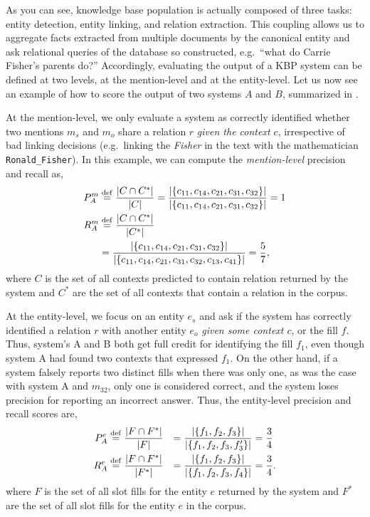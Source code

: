 As you  can see, knowledge base population is actually composed of three tasks: entity detection, entity linking, and relation extraction.
This coupling allows us to aggregate facts extracted from multiple documents by the canonical entity and ask relational  queries of the database so constructed, e.g.\ ``what do Carrie Fisher's parents do?''
Accordingly, evaluating the output of a KBP system can be defined at two levels, at the mention-level and at the entity-level.
Let us now see an example of how to score the output of two systems $A$ and $B$, summarized in .

At the mention-level, we only evaluate a system as correctly identified whether two mentions $m_s$ and $m_o$ share a relation $r$ \textit{given the context $c$}, irrespective of bad linking decisions (e.g.\ linking the \textit{Fisher} in the text with the mathematician \texttt{Ronald\_Fisher}).
In this example, we can compute the \textit{mention-level} precision and recall  as, 
\begin{align*}
  P^m_A &\stackrel{\rm def}{=} \frac{|C \cap C^*|}{|C|} = \frac{|\{c_{11}, c_{14}, c_{21}, c_{31}, c_{32}\}|}{|\{c_{11}, c_{14}, c_{21}, c_{31}, c_{32}\}|} = 1 \\
  R^m_A &\stackrel{\rm def}{=} \frac{|C \cap C^*|}{|C^*|}\\
  &= \frac{|\{c_{11}, c_{14}, c_{21}, c_{31}, c_{32}\}|}{|\{c_{11}, c_{14}, c_{21}, c_{31}, c_{32}, c_{13}, {c_{41}}\}|} = \frac{5}{7},
\end{align*}
where $C$ is the set of all contexts predicted to contain relation returned by the system and $C^*$ are the set of all contexts that contain a relation in the corpus.

At the entity-level, we focus on an entity $e_s$ and ask if the system has correctly identified a relation $r$ with another entity $e_o$ \textit{given some context $c$}, or the fill $f$.
Thus, system's A and B both get full credit for identifying the fill $f_1$, even though system A had found two contexts that expressed $f_1$.  
On the other hand, if a system falsely reports two distinct fills when there was only one, as was the case with system A and $m_{32}$, only one is considered correct, and the system loses precision for reporting an incorrect answer. 
Thus, the entity-level precision and recall scores are,
\begin{align*}
  P^e_A &\stackrel{\rm def}{=} \frac{|F \cap F^*|}{|F|} &= \frac{|\{f_{1}, f_{2}, f_{3}\}|}{|\{f_{1}, f_{2}, f_{3}, f_{3}'\}|} &= \frac{3}{4} \\
  R^e_A &\stackrel{\rm def}{=} \frac{|F \cap F^*|}{|F^*|} &= \frac{|\{f_{1}, f_{2}, f_{3}\}|}{|\{f_{1}, f_{2}, f_{3}, f_{4}\}|} &= \frac{3}{4}.
\end{align*}
where $F$ is the set of all slot fills for the entity $e$ returned by the system and $F^*$ are the set of all slot fills for the entity $e$ in the corpus.

